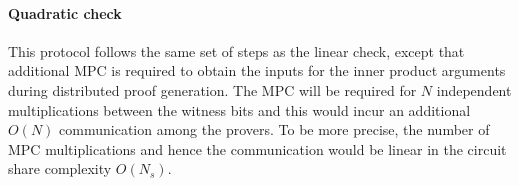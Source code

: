 \paragraph{Quadratic check} This protocol follows the same set of steps as the linear check, except that additional MPC is required to obtain the inputs for the inner product arguments during distributed proof generation. The MPC will be required for $N$ independent multiplications between the witness bits and this would incur an additional $O(N)$ communication among the provers. To be more precise, the number of MPC multiplications and hence the communication would be linear in the circuit share complexity $O(N_s)$.

%
%
%
